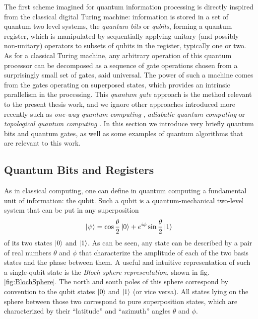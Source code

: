 The first scheme imagined for quantum information processing is directly inspired from the classical digital Turing machine: information is stored in a set of quantum two level systems, the {\it quantum bits} or {\it qubits}, forming a quantum register, which is manipulated by sequentially applying unitary (and possibly non-unitary) operators to subsets of qubits in the register, typically one or two. As for a classical Turing machine, any arbitrary operation of this quantum processor can be decomposed as a sequence of gate operations chosen from a surprisingly small set of gates, said universal. The power of such a machine comes from the gates operating on superposed states, which provides an intrinsic parallelism in the processing.
\smallskip
This {\it quantum gate} approach is the method relevant to the present thesis work, and we ignore other approaches introduced more recently such as {\it one-way quantum computing} \citep{raussendorf_one-way_2001}, {\it adiabatic quantum computing} \citep{farhi_quantum_2000} or {\it topological quantum computing} \citep{kitaev_fault-tolerant_2003}. In this section we introduce very briefly quantum bits and quantum gates, as well as some examples of quantum algorithms that are relevant to this work.


\subsection{Quantum Bits and Registers}

As in classical computing, one can define in quantum computing a fundamental unit of information: the qubit. Such a qubit is a quantum-mechanical two-level system that can be put in any superposition
%
\begin{equation}
\left| \psi \right> = \cos{\frac{\theta}{2}}\left| 0 \right>+e^{i\phi}\sin{\frac{\theta}{2}}\left| 1 \right>
\end{equation}
%
of its two states $\left| 0 \right>$ and $\left| 1 \right>$.
As can be seen, any state can be described by a pair of real numbers $\theta$ and $\phi$ that characterize the amplitude of each of the two basis states and the phase between them. A useful and intuitive representation of such a single-qubit state is the {\it Bloch sphere representation}, shown in fig. \ref{fig:BlochSphere}. The north and south poles of this sphere correspond by convention to the qubit states $\left| 0 \right>$ and $\left| 1 \right>$ (or vice versa). All states lying on the sphere between those two correspond to pure superposition states, which are characterized by their ``latitude'' and ``azimuth'' angles $\theta$ and $\phi$. 


